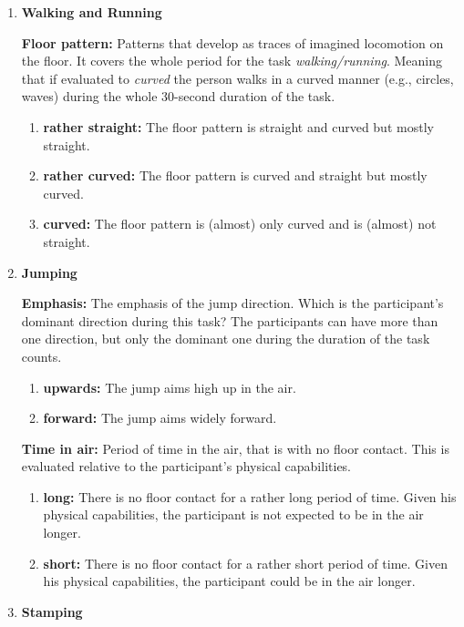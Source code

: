 \documentclass[extern,palatino]{cgMA}
\begin{document}
\begin{enumerate}[I]
\item \textbf{Walking and Running}

    \textbf{Floor pattern:} Patterns that develop as traces of imagined locomotion on the floor. It covers the whole period for the task \textit{walking/running}. Meaning that if evaluated to \textit{curved} the person walks in a curved manner (e.g., circles, waves) during the whole 30-second duration of the task.
    \begin{enumerate}
        \item \textbf{rather straight:} The floor pattern is straight and curved but mostly straight.
        \item \textbf{rather curved:} The floor pattern is curved and straight but mostly curved.
        \item \textbf{curved:} The floor pattern is (almost) only curved and is (almost) not straight.
    \end{enumerate}
\item \textbf{Jumping}

    \textbf{Emphasis:} The emphasis of the jump direction. Which is the participant’s dominant direction during this task? The participants can have more than one direction, but only the dominant one during the duration of the task counts.
    \begin{enumerate}
        \item \textbf{upwards:} The jump aims high up in the air.
        \item \textbf{forward:} The jump aims widely forward.
    \end{enumerate}
    \textbf{Time in air:} Period of time in the air, that is with no floor contact. This is evaluated relative to the participant's physical capabilities.
    \begin{enumerate}
        \item \textbf{long:} There is no floor contact for a rather long period of time. Given his physical capabilities, the participant is not expected to be in the air longer.
        \item \textbf{short:} There is no floor contact for a rather short period of time. Given his physical capabilities, the participant could be in the air longer.
    \end{enumerate}
\item \textbf{Stamping}


\end{enumerate}
\end{document}
